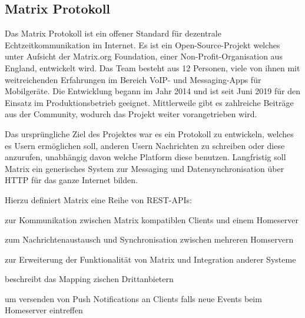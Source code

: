     \subsection{Matrix Protokoll}\label{subsec:matrix-protokoll}
    Das Matrix Protokoll ist ein offener Standard für dezentrale Echtzeitkommunikation im Internet.
    Es ist ein Open-Source-Projekt welches unter Aufsicht der Matrix.org Foundation, einer Non-Profit-Organisation aus England, entwickelt wird.
    Das Team besteht aus 12 Personen, viele von ihnen mit weitreichenden Erfahrungen im Bereich VoIP- und Messaging-Apps für Mobilgeräte.
    Die Entwicklung begann im Jahr 2014 und ist seit Juni 2019 für den Einsatz im Produktionsbetrieb geeignet.
    Mittlerweile gibt es zahlreiche Beiträge aus der Community, wodurch das Projekt weiter vorangetrieben wird.
    ~\cite{matrixfaq}

    Das ursprüngliche Ziel des Projektes war es ein Protokoll zu entwickeln, welches es Usern ermöglichen soll, anderen Usern Nachrichten zu schreiben oder diese anzurufen, unabhängig davon welche Platform diese benutzen.
    Langfristig soll Matrix ein generisches System zur Messaging und Datensynchronisation über HTTP für das ganze Internet bilden.
    ~\cite{matrixfaq}

    Hierzu definiert Matrix eine Reihe von REST-APIs:
    \begin{description}[leftmargin=!,labelwidth=5.5cm]
        \item [Client-Server-API\footnotemark]  zur Kommunikation zwischen Matrix kompatiblen Clients und einem Homeserver
        \item [Server-Server-API\footnotemark]  zum Nachrichtenaustausch und Synchronisation zwischen mehreren Homservern
        \item [Application-Service-API\footnotemark]  zur Erweiterung der Funktionalität von Matrix und Integration anderer Systeme
        \item [Identity-Service-API\footnotemark]  beschreibt das Mapping zischen Drittanbietern
        \item [Push-Gateway-API\footnotemark]  um versenden von Push Notifications an Clients falls neue Events beim Homeserver eintreffen
    \end{description}



